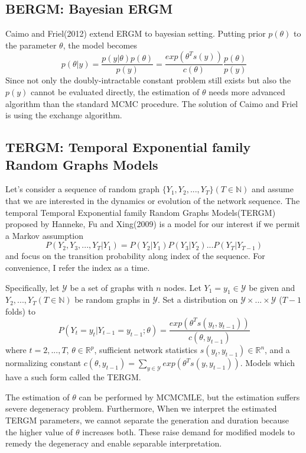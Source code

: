 \documentclass[aspectratio=169,ignorenonframetext,9pt]{beamer}
\theoremstyle{plain}
\theoremstyle{definition}
\begin{document}
\subsection{BERGM: Bayesian ERGM}
Caimo and Friel(2012) %
extend ERGM to bayesian setting. Putting prior $p(\theta)$ to the parameter $\theta$, the model becomes
\[p(\theta|y)=\frac{p(y|\theta)p(\theta)}{p(y)}=\frac{exp(\theta^T s(y))}{c(\theta)}\frac{p(\theta)}{p(y)}\]
Since not only the doubly-intractable constant problem still exists but also the $p(y)$ cannot be evaluated directly,
the estimation of $\theta$ needs more advanced algorithm than the standard MCMC procedure.
The solution of Caimo and Friel is using the exchange algorithm.



\subsection{TERGM: Temporal Exponential family Random Graphs Models}
Let's consider a sequence of random graph $\{Y_1, Y_2, ..., Y_T\} (T\in\mathbb{N})$ and assume that
we are interested in the dynamics or evolution of the network sequence.
The temporal Temporal Exponential family Random Graphs Models(TERGM)
proposed by Hanneke, Fu and Xing(2009)%
is a model for our interest if we permit a Markov assumption
\[P(Y_2,Y_3,...,Y_T|Y_1)=P(Y_2|Y_1)P(Y_3|Y_2)...P(Y_T|Y_{T-1})\]
and focus on the transition probability along index of the sequence.
For convenience, I refer the index as a time.

Specifically, let $\mathcal{Y}$ be a set of graphs with $n$ nodes. 
Let $Y_1=y_1 \in \mathcal{Y}$ be given and $Y_2,...,Y_T (T\in\mathbb{N})$ be random graphs in $\mathcal{Y}$.
Set a distribution on $\mathcal{Y}\times ... \times \mathcal{Y}$ ($T-1$ folds) to
\[P(Y_t=y_t|Y_{t-1}=y_{t-1};\theta) = \frac{exp(\theta^{T}s(y_t, y_{t-1}))}{c(\theta, y_{t-1})}\]
where $t=2,...,T$, $\theta\in\mathbb{R}^p$,
sufficient network statistics $s(y_t, y_{t-1})\in\mathbb{R}^n$,
and a normalizing constant $c(\theta, y_{t-1})=\sum_{y\in\mathcal{Y}}exp(\theta^{T}s(y, y_{t-1}))$.
Models which have a such form called the TERGM.

The estimation of $\theta$ can be performed by MCMCMLE,
but the estimation suffers severe degeneracy problem.
Furthermore, When we interpret the estimated TERGM parameters,
we cannot separate the generation and duration because
the higher value of $\theta$ increases both.
These raise demand for modified models to remedy the degeneracy and enable separable interpretation.
\end{document}
